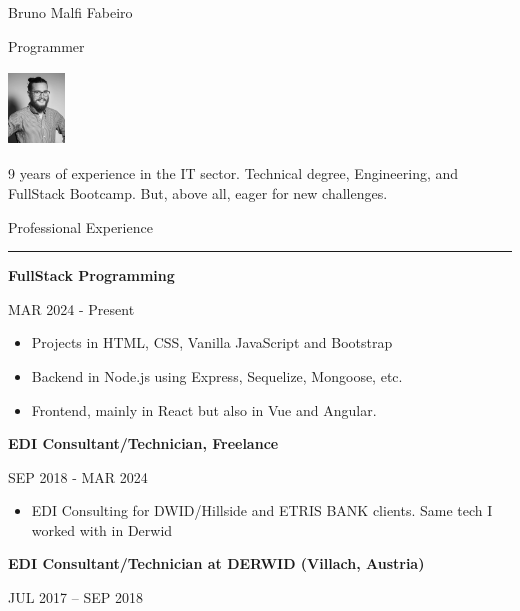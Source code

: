 \documentclass{letter}
\begin{document}
\begin{minipage}[t]{0.60\textwidth}
\setlength{\baselineskip}{1.5\baselineskip}
\vspace{0.8cm}

\begin{minipage}{0.8\linewidth} 
    {\huge Bruno Malfi Fabeiro}

    {\large Programmer}
\end{minipage}
\begin{minipage}{0.1\linewidth}
    \includegraphics[width=1.5cm, height=2cm]{foto2.jpg}
\end{minipage}

\vspace{0.2cm}
 
9 years of experience in the IT sector.
Technical degree, Engineering, and FullStack Bootcamp.
But, above all, eager for new challenges.

\vspace{0.5cm}

{\large Professional Experience}
\rule{\linewidth}{0.4pt}
{\large \textbf{FullStack Programming}}

{\small MAR 2024 - Present}

\begin{itemize}
    \item Projects in  HTML,  CSS, \faJs Vanilla  JavaScript and \faBootstrap Bootstrap
    \item Backend in Node.js using Express, Sequelize, Mongoose, etc.
    \item Frontend, mainly in React but also in Vue and Angular.
\end{itemize}

{\large \textbf{EDI Consultant/Technician, Freelance}}

{\small SEP 2018 - MAR 2024}

\begin{itemize}
    \item EDI Consulting for DWID/Hillside and ETRIS BANK clients. Same tech I worked with in Derwid
\end{itemize}

{\large \textbf{EDI Consultant/Technician at DERWID (Villach, Austria)}}

{\small JUL 2017 – SEP 2018}


\end{minipage}
\end{document}
